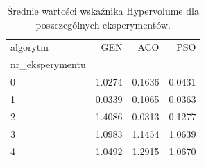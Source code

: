 \begin{table}
\caption{Średnie wartości wskaźnika Hypervolume dla poszczególnych eksperymentów.}
\label{tab:hv_srednie}
\begin{tabular}{lrrr}
\toprule
algorytm & GEN & ACO & PSO \\
nr_eksperymentu &  &  &  \\
\midrule
0 & 1.0274 & 0.1636 & 0.0431 \\
1 & 0.0339 & 0.1065 & 0.0363 \\
2 & 1.4086 & 0.0313 & 0.1277 \\
3 & 1.0983 & 1.1454 & 1.0639 \\
4 & 1.0492 & 1.2915 & 1.0670 \\
\bottomrule
\end{tabular}
\end{table}
